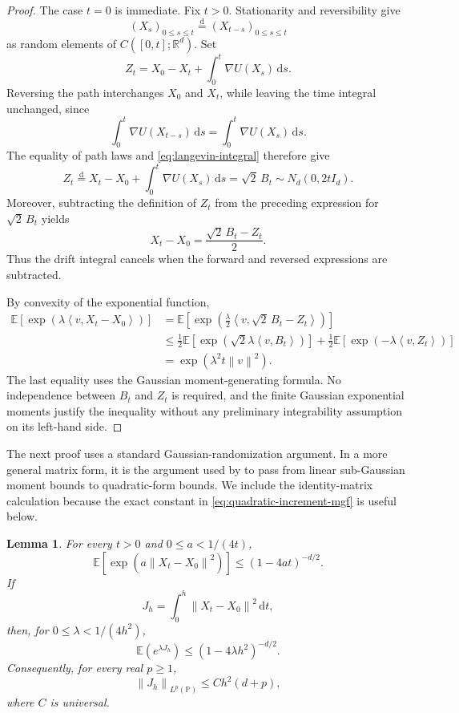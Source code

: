 \documentclass[11pt]{article}
\newtheorem{lemma}[lemma]{Lemma}
\newcommand{\R}{\mathbb R}
\newcommand{\E}{\mathbb E}
\newcommand{\ip}[2]{\left\langle #1,#2\right\rangle}
\newcommand{\norm}[1]{\left\lVert #1\right\rVert}
\newcommand{\1}{\mathbf 1}
\newcommand{\df}{\mathrm{d}}
\begin{document}
	\begin{proof}
		The case \(t=0\) is immediate. Fix \(t>0\).
		Stationarity and reversibility give
		\[
		(X_s)_{0\leq s\leq t}
		\stackrel{\mathrm d}{=}
		(X_{t-s})_{0\leq s\leq t}
		\]
		as random elements of \(C([0,t];\R^d)\).
		Set
		\[
		Z_t=X_0-X_t+\int_0^t\nabla U(X_s)\,\df s.
		\]
		Reversing the path interchanges \(X_0\) and \(X_t\), while leaving
		the time integral unchanged, since
		\[
		\int_0^t\nabla U(X_{t-s})\,\df s
		=
		\int_0^t\nabla U(X_s)\,\df s.
		\]
		The equality of path laws and \eqref{eq:langevin-integral} therefore give
		\[
		Z_t
		\stackrel{\mathrm d}{=}
		X_t-X_0+\int_0^t\nabla U(X_s)\,\df s
		=
		\sqrt{2}\,B_t
		\sim N_d(0,2tI_d).
		\]
		Moreover, subtracting the definition of \(Z_t\) from the preceding
		expression for \(\sqrt{2}\,B_t\) yields
		\[
		X_t-X_0=\frac{\sqrt{2}\,B_t-Z_t}{2}.
		\]
		Thus the drift integral cancels when the forward and reversed
		expressions are subtracted.
		
		By convexity of the exponential function,
		\begin{align*}
			\E[\exp(\lambda\ip{v}{X_t-X_0})]
			&=
			\E\left[
			\exp\left(\frac{\lambda}{2}
			\ip{v}{\sqrt{2}\,B_t-Z_t}\right)
			\right]\\
			&\leq
			\frac12\E[\exp(\sqrt{2}\lambda\ip{v}{B_t})]
			+
			\frac12\E[\exp(-\lambda\ip{v}{Z_t})]\\
			&=
			\exp(\lambda^2t\norm{v}^2).
		\end{align*}
		The last equality uses the Gaussian moment-generating formula.
		No independence between \(B_t\) and \(Z_t\) is required, and the
		finite Gaussian exponential moments justify the inequality without
		any preliminary integrability assumption on its left-hand side.
	\end{proof}
	
	The next proof uses a standard Gaussian-randomization argument.  In a more
	general matrix form, it is the argument used by
	\citet[Theorem~1 and Remark~2]{HsuKakadeZhang2012} to pass from linear
	sub-Gaussian moment bounds to quadratic-form bounds.  We include the
	identity-matrix calculation because the exact constant in
	\eqref{eq:quadratic-increment-mgf} is useful below.
	
	\begin{lemma} \label{lem:integrated-increments}
		For every \(t>0\) and \(0\leq a<1/(4t)\),
		\begin{equation}\label{eq:quadratic-increment-mgf}
			\E[\exp(a\norm{X_t-X_0}^2)]
			\leq
			(1-4at)^{-d/2}.
		\end{equation}
		If
		\[
		J_h=\int_0^h\norm{X_t-X_0}^2\,\df t,
		\]
		then, for \(0\leq\lambda<1/(4h^2)\),
		\begin{equation}\label{eq:Jh-mgf}
			\E (e^{\lambda J_h})
			\leq
			(1-4\lambda h^2)^{-d/2}.
		\end{equation}
		Consequently, for every real \(p\geq1\),
		\begin{equation}\label{eq:Jh-moment}
			\norm{J_h}_{L^p(\mathbb P)}
			\leq
			C h^2(d+p),
		\end{equation}
		where \(C\) is universal.
	\end{lemma}
	
\end{document}
